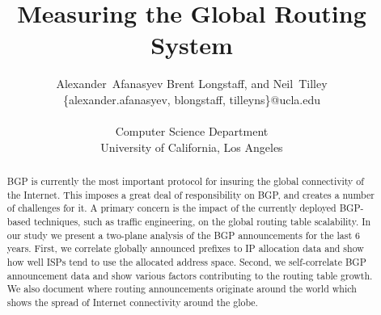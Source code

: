\documentclass[conference]{IEEEtran}%
\title{Measuring the Global Routing System}
\author{Alexander~Afanasyev %
Brent Longstaff, and Neil~Tilley \\ %
\small \{alexander.afanasyev, blongstaff, tilleyns\}@ucla.edu \\ \\
\small Computer Science Department \\
\small University of California, Los Angeles 
}
\begin{document}
\maketitle

\begin{abstract} %

BGP is currently the most important protocol for insuring the global
connectivity of the Internet. This imposes a great deal of responsibility on
BGP, and creates a number of challenges for it. A primary concern is the
impact of the currently deployed BGP-based techniques, such as traffic
engineering, on the global routing table scalability. In our study we present
a two-plane analysis of the BGP announcements for the last 6 years. First, we
correlate globally announced prefixes to IP allocation data and show how well
ISPs tend to use the allocated address space. Second, we self-correlate BGP
announcement data and show various factors contributing to the routing table
growth. We also document where routing announcements originate around the
world which shows the spread of Internet connectivity around the globe.

\end{abstract}











% 
% 



\end{document}
